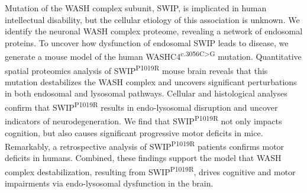 
\justify Mutation of the WASH complex subunit, SWIP, is implicated in human
intellectual disability, but the cellular etiology of this association is
unknown. We identify the neuronal WASH complex proteome, revealing a network of
endosomal proteins. To uncover how dysfunction of endosomal SWIP leads to
disease, we generate a mouse model of the human
WASHC4\textsuperscript{c.3056C>G} mutation.  Quantitative spatial proteomics
analysis of SWIP\textsuperscript{P1019R} mouse brain reveals that this mutation
destabilizes the WASH complex and uncovers significant  perturbations in both
endosomal and lysosomal pathways.  Cellular and histological analyses confirm
that SWIP\textsuperscript{P1019R} results in  endo-lysosomal disruption and
uncover indicators of neurodegeneration. We find that
SWIP\textsuperscript{P1019R} not only impacts cognition, but also causes
significant progressive motor deficits in mice.  Remarkably, a retrospective
analysis of SWIP\textsuperscript{P1019R} patients confirms motor deficits in
humans. Combined, these findings support the model that WASH complex
destabilization, resulting from SWIP\textsuperscript{P1019R}, drives cognitive
and motor impairments via endo-lysosomal dysfunction in the brain.
